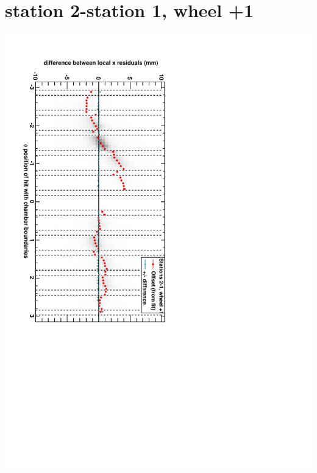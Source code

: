\documentclass[compress]{beamer}
\begin{document}
\section*{station 2-station 1, wheel +1}
\begin{frame} \vfill \mbox{\hspace{-1 cm}\includegraphics[height=1.2\linewidth, angle=90]{DTrphidiff12VsPhi_whD_slope.pdf}} \end{frame}
\end{document}
